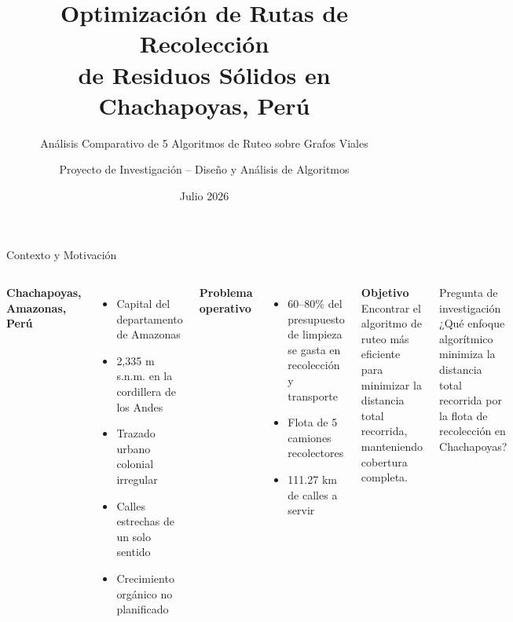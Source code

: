 \documentclass[11pt,aspectratio=169]{beamer}
\title[Optimización de Rutas -- Chachapoyas]{Optimización de Rutas de Recolección\\de Residuos Sólidos en Chachapoyas, Perú}
\subtitle{Análisis Comparativo de 5 Algoritmos de Ruteo sobre Grafos Viales}
\author{Proyecto de Investigación -- Diseño y Análisis de Algoritmos}
\date{Julio 2026}
\begin{document}
\begin{frame}
\titlepage
\end{frame}

\begin{frame}{Contexto y Motivación}
\begin{columns}[T]
\textbf{Chachapoyas, Amazonas, Perú}
\begin{itemize}
  \item Capital del departamento de Amazonas
  \item 2,335 m s.n.m. en la cordillera de los Andes
  \item Trazado urbano colonial irregular
  \item Calles estrechas de un solo sentido
  \item Crecimiento orgánico no planificado
\end{itemize}

\vspace{8pt}
\textbf{Problema operativo}
\begin{itemize}
  \item 60--80\% del presupuesto de limpieza se gasta en recolección y transporte
  \item Flota de 5 camiones recolectores
  \item 111.27 km de calles a servir
\end{itemize}

\centering
\textbf{Objetivo}\\
\smallskip
Encontrar el algoritmo de ruteo más eficiente para minimizar la distancia total recorrida, manteniendo cobertura completa.
\bigskip

\begin{block}{Pregunta de investigación}
¿Qué enfoque algorítmico minimiza la distancia total recorrida por la flota de recolección en Chachapoyas?
\end{block}
\end{columns}
\end{frame}
\end{document}
